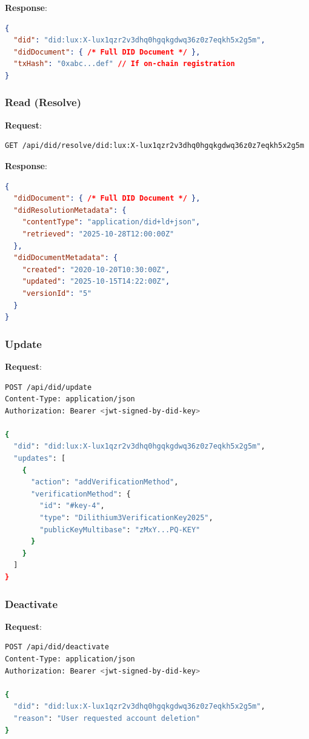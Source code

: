\textbf{Response}:
\begin{lstlisting}[language=json]
{
  "did": "did:lux:X-lux1qzr2v3dhq0hgqkgdwq36z0z7eqkh5x2g5m",
  "didDocument": { /* Full DID Document */ },
  "txHash": "0xabc...def" // If on-chain registration
}
\end{lstlisting}

\subsubsection{Read (Resolve)}

\textbf{Request}:
\begin{lstlisting}[language=bash]
GET /api/did/resolve/did:lux:X-lux1qzr2v3dhq0hgqkgdwq36z0z7eqkh5x2g5m
\end{lstlisting}

\textbf{Response}:
\begin{lstlisting}[language=json]
{
  "didDocument": { /* Full DID Document */ },
  "didResolutionMetadata": {
    "contentType": "application/did+ld+json",
    "retrieved": "2025-10-28T12:00:00Z"
  },
  "didDocumentMetadata": {
    "created": "2020-10-20T10:30:00Z",
    "updated": "2025-10-15T14:22:00Z",
    "versionId": "5"
  }
}
\end{lstlisting}

\subsubsection{Update}

\textbf{Request}:
\begin{lstlisting}[language=bash]
POST /api/did/update
Content-Type: application/json
Authorization: Bearer <jwt-signed-by-did-key>

{
  "did": "did:lux:X-lux1qzr2v3dhq0hgqkgdwq36z0z7eqkh5x2g5m",
  "updates": [
    {
      "action": "addVerificationMethod",
      "verificationMethod": {
        "id": "#key-4",
        "type": "Dilithium3VerificationKey2025",
        "publicKeyMultibase": "zMxY...PQ-KEY"
      }
    }
  ]
}
\end{lstlisting}

\subsubsection{Deactivate}

\textbf{Request}:
\begin{lstlisting}[language=bash]
POST /api/did/deactivate
Content-Type: application/json
Authorization: Bearer <jwt-signed-by-did-key>

{
  "did": "did:lux:X-lux1qzr2v3dhq0hgqkgdwq36z0z7eqkh5x2g5m",
  "reason": "User requested account deletion"
}
\end{lstlisting}

